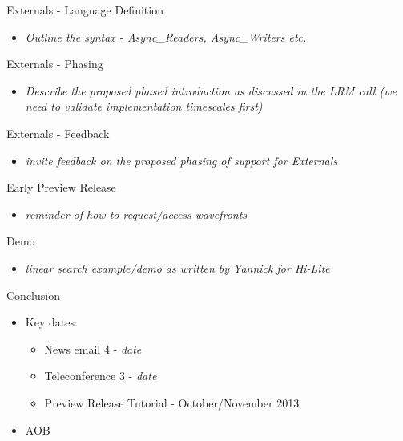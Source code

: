 \documentclass{beamer}
\begin{document}
\begin{frame}{Externals - Language Definition}

  \begin{itemize}
  \item \emph{Outline the syntax - Async\_Readers, Async\_Writers etc.}
  \end{itemize}
 
\end{frame}

\begin{frame}{Externals - Phasing}

  \begin{itemize}
  \item \emph{Describe the proposed phased introduction as discussed in the LRM call (we need to validate implementation timescales first)}
  \end{itemize}
 
\end{frame}

\begin{frame}{Externals - Feedback}

  \begin{itemize}
  \item \emph{invite feedback on the proposed phasing of support for Externals}
  \end{itemize}
 
\end{frame}

\begin{frame}{Early Preview Release}

  \begin{itemize}
  \item \emph{reminder of how to request/access wavefronts}
  \end{itemize}
 
\end{frame}

\begin{frame}{Demo}

  \begin{itemize}
  \item \emph{linear search example/demo as written by Yannick for Hi-Lite}
  \end{itemize}
 
\end{frame}

\begin{frame}{Conclusion}

  \begin{itemize}

  \item Key dates: 
    \begin{itemize}
    \item News email 4 - \emph{date}
    \item Teleconference 3 - \emph{date}
    \item Preview Release Tutorial - October/November 2013
    \end{itemize}

  \item AOB

  \end{itemize}

\end{frame}
\end{document}
